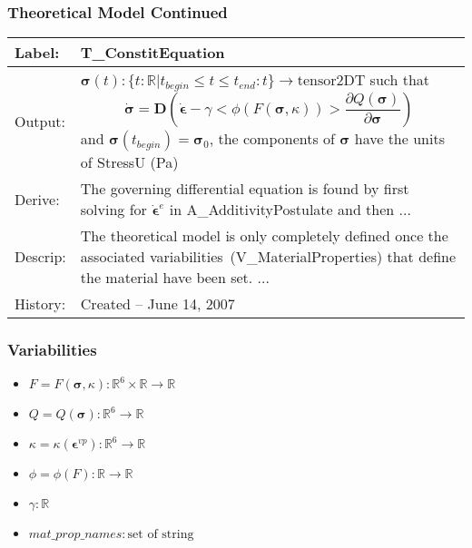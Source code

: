 \documentclass[t,12pt,numbers,fleqn]{beamer}
\newcommand{\colAwidth}{0.15\textwidth}
\newcommand{\colBwidth}{0.7\textwidth}
\begin{document}
\begin{frame}

\frametitle{Theoretical Model Continued}

\begin{minipage}{\textwidth}
\begin{tabular}{| p{\colAwidth} | p{\colBwidth}|}
\hline
\rowcolor[gray]{0.9}
Label: & T\_ConstitEquation\\
\hline
Output: & $\bm{\sigma}(t): \{ t: \mathbb{R} | t_{\mathit{begin}} \leq t \leq t_{\mathit{end}} : t \} \rightarrow
\mbox{tensor2DT}$ such that 
$$\dot{\bm{\sigma}} = \mathbf{D} \left ( \dot{\bm{\epsilon}} - \gamma < \phi (F(\bm{\sigma},\kappa) ) >
\frac {
\partial Q (\bm{\sigma})}{
\partial \bm{\sigma}} \right )
$$ 
and $\bm{\sigma}(t_{\mathit{begin}}) = \bm{\sigma}_0$,
the components of $\bm{\sigma}$ have the units of StressU (Pa)\\
\hline
Derive: & The governing differential equation is found by first solving for $\dot{\bm{\epsilon}}^e$
in {A\_AdditivityPostulate} and then ...\\
\hline
Descrip: & The theoretical model is only completely defined once the associated
variabilities~({V\_MaterialProperties}) that define the
material have been set.  ...\\
\hline History: & Created -- June 14, 2007\\
\hline
\end{tabular}
\end{minipage}

\end{frame}


\begin{frame}

\frametitle{Variabilities}

\begin{itemize}
\item $F = F(\bm{\sigma}, \kappa): \mathbb{R}^6 \times \mathbb{R} \rightarrow \mathbb{R}$
\item $Q = Q(\bm{\sigma}): \mathbb{R}^6 \rightarrow \mathbb{R}$
\item $\kappa = \kappa(\bm{\epsilon}^{\mathit{vp}}): \mathbb{R}^6 \rightarrow \mathbb{R}$
\item $\phi = \phi(F): \mathbb{R} \rightarrow \mathbb{R}$
\item $\gamma: \mathbb{R}$
\item $\mathit{mat\_prop\_names}: \mbox{set of string}$
\end{itemize}

\end{frame}
\end{document}
